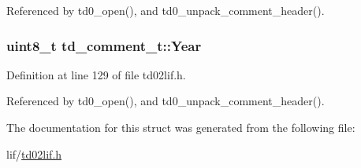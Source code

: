 Referenced by td0\+\_\+open(), and td0\+\_\+unpack\+\_\+comment\+\_\+header().

\subsubsection[{\texorpdfstring{Year}{Year}}]{\setlength{\rightskip}{0pt plus 5cm}uint8\+\_\+t td\+\_\+comment\+\_\+t\+::\+Year}\hypertarget{structtd__comment__t_a0c804ec07303f411dd508dc64900aff5}{}\label{structtd__comment__t_a0c804ec07303f411dd508dc64900aff5}


Definition at line 129 of file td02lif.\+h.



Referenced by td0\+\_\+open(), and td0\+\_\+unpack\+\_\+comment\+\_\+header().



The documentation for this struct was generated from the following file\+:\begin{DoxyCompactItemize}
\item 
lif/\hyperlink{td02lif_8h}{td02lif.\+h}\end{DoxyCompactItemize}

